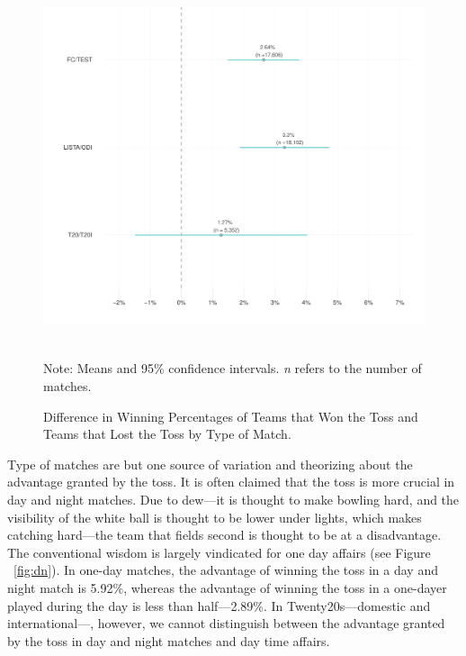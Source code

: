 \documentclass[12pt]{article}
\begin{document}
\begin{figure}[htbp]
\caption{Difference in Winning Percentages of Teams that Won the Toss and Teams that Lost the Toss by Type of Match.}
\centering
\includegraphics[scale=1]{../figs/winbyType.pdf}
{\footnotesize \\ Note: Means and 95\% confidence intervals. \emph{n} refers to the number of matches.\par}
\label{fig:type}
\end{figure}

Type of matches are but one source of variation and theorizing about the advantage granted by the toss. It is often claimed that the toss is more crucial in day and night matches. Due to dew---it is thought to make bowling hard, and the visibility of the white ball is thought to be lower under lights, which makes catching hard---the team that fields second is thought to be at a disadvantage. The conventional wisdom is largely vindicated for one day affairs (see Figure ~\ref{fig:dn}). In one-day matches, the advantage of winning the toss in a day and night match is 5.92\%, whereas the advantage of winning the toss in a one-dayer played during the day is less than half---2.89\%. In Twenty20s---domestic and international---, however, we cannot distinguish between the advantage granted by the toss in day and night matches and day time affairs.
\end{document}

